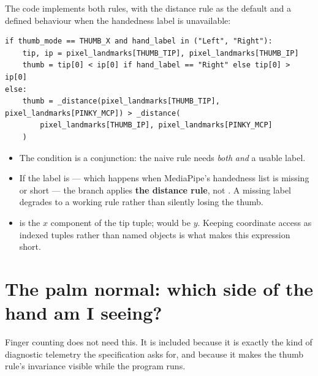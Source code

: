 The code implements both rules, with the distance rule as the default and a defined behaviour when
the handedness label is unavailable:

\begin{codecard}
\begin{lstlisting}
if thumb_mode == THUMB_X and hand_label in ("Left", "Right"):
    tip, ip = pixel_landmarks[THUMB_TIP], pixel_landmarks[THUMB_IP]
    thumb = tip[0] < ip[0] if hand_label == "Right" else tip[0] > ip[0]
else:
    thumb = _distance(pixel_landmarks[THUMB_TIP], pixel_landmarks[PINKY_MCP]) > _distance(
        pixel_landmarks[THUMB_IP], pixel_landmarks[PINKY_MCP]
    )
\end{lstlisting}
\end{codecard}

\begin{itemize}
  \item The condition is a conjunction: the naive rule needs \emph{both} 
        \emph{and} a usable label.
  \item If the label is  --- which happens when MediaPipe's handedness list is
        missing or short --- the  branch applies \textbf{the distance rule}, not
        . A missing label degrades to a working rule rather than silently losing the
        thumb.
  \item {} is the $x$ component of the tip tuple;  would be $y$. Keeping
        coordinate access as indexed tuples rather than named objects is what makes this expression
        short.
\end{itemize}

\section{The palm normal: which side of the hand am I seeing?}
\label{sec:palm}

Finger counting does not need this. It is included because it is exactly the kind of diagnostic
telemetry the specification asks for, and because it makes the thumb rule's invariance visible while
the program runs.

